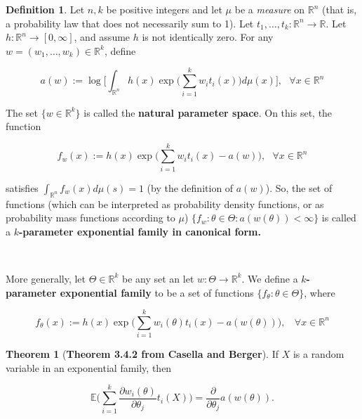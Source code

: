 \documentclass{article}
\newcommand{\pderiv}[2]{\frac{\partial #1}{\partial #2}}
\newcommand{\E}{\mathbb{E}}
\theoremstyle{definition}
\newtheorem{theorem}{Theorem}
\theoremstyle{definition}
\newtheorem{proposition}[theorem]{Proposition}
\theoremstyle{definition}
\theoremstyle{definition}
\theoremstyle{definition}
\newtheorem{definition}{Definition}[section]
\theoremstyle{definition}
\theoremstyle{definition}
\begin{document}
\begin{definition}\label{prob.defn.exp.fams} Let \(n, k\) be positive integers and let \(\mu\) be a \textit{measure} on \(\mathbb{R}^n\) (that is, a probability law that does not necessarily sum to 1). Let \(t_1, \ldots, t_k : \mathbb{R}^n \to \mathbb{R}\). Let \(h: \mathbb{R}^n \to [0, \infty]\), and assume \(h\) is not identically zero. For any \(w = (w_1, \ldots, w_k) \in \mathbb{R}^k\), define

\[
a(w) := \log \bigg[ \int_{\mathbb{R}^n} h(x) \exp \bigg( \sum_{i=1}^k w_i t_i(x) \bigg) d \mu(x) \bigg], \ \ \ \forall x \in \mathbb{R}^n
\]

The set \(\{w \in \mathbb{R}^k\}\) is called the \textbf{natural parameter space}. On this set, the function

\[
f_w(x) := h(x) \exp \bigg( \sum_{i=1}^k w_i t_i(x) - a(w) \bigg), \ \ \ \forall x \in \mathbb{R}^n
\]

satisfies \(\int_{\mathbb{R}^n} f_w(x) d \mu(s) = 1\) (by the definition of \(a(w)\)). So, the set of functions (which can be interpreted as probability density functions, or as probability mass functions according to \(\mu\)) \(\{f_w: \theta \in \Theta: a(w(\theta)) < \infty \}\) is called a \textbf{\(k\)-parameter exponential family in canonical form.} 
 
 \
 
 More generally, let \(\Theta \in \mathbb{R}^k\) be any set an let \(w: \Theta \to \mathbb{R}^k\). We define a \textbf{\(k\)-parameter exponential family} to be a set of functions \(\{f_{\theta}: \theta \in \Theta\}\), where
 
 \[
 f_{\theta}(x) := h(x) \exp \bigg( \sum_{i=1}^k w_i(\theta) t_i(x) - a(w(\theta))\bigg), \ \ \ \ \forall x \in \mathbb{R}^n
 \]
 

\end{definition}


\begin{theorem}[\textbf{Theorem 3.4.2 from Casella and Berger}] If \(X\) is a random variable in an exponential family, then

\begin{equation}\label{prob.thm.3.4.2.casella}
\E \Bigg( \sum_{i=1}^k \pderiv{w_i(\theta)}{\theta_j} t_i(X) \Bigg) =  \pderiv{}{\theta_j}  a(w(\theta)).
\end{equation}

\end{theorem}

%
%
\end{document}
